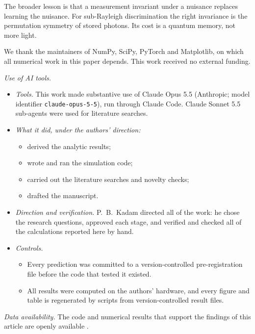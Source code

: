 \documentclass[reprint,pra,aps,amsmath,amssymb,superscriptaddress,nofootinbib]{revtex4-2}
\begin{document}
The broader lesson is that a measurement invariant under a nuisance replaces learning the nuisance. For sub-Rayleigh
discrimination the right invariance is the permutation symmetry of stored photons. Its cost is a quantum memory, not
more light.

\begin{acknowledgments}
We thank the maintainers of NumPy, SciPy, PyTorch and Matplotlib, on which all numerical work in this paper
depends. This work received no external funding.

\emph{Use of AI tools.}
\begin{itemize}
\item \emph{Tools.} This work made substantive use of Claude Opus 5.5 (Anthropic; model identifier
  \texttt{claude-opus-5-5}), run through Claude Code. Claude Sonnet 5.5 sub-agents were used for literature
  searches.
\item \emph{What it did, under the authors' direction:}
  \begin{itemize}
  \item derived the analytic results;
  \item wrote and ran the simulation code;
  \item carried out the literature searches and novelty checks;
  \item drafted the manuscript.
  \end{itemize}
\item \emph{Direction and verification.} P.~B.~Kadam directed all of the work: he chose the research questions,
  approved each stage, and verified and checked all of the calculations reported here by hand.
\item \emph{Controls.}
  \begin{itemize}
  \item Every prediction was committed to a version-controlled pre-registration file before the code that tested
    it existed.
  \item All results were computed on the authors' hardware, and every figure and table is regenerated by scripts
    from version-controlled result files.
  \end{itemize}
\end{itemize}
\end{acknowledgments}

\emph{Data availability.} The code and numerical results that support the findings of this article are openly
available \cite{QKrepo}.

\appendix



\end{document}

